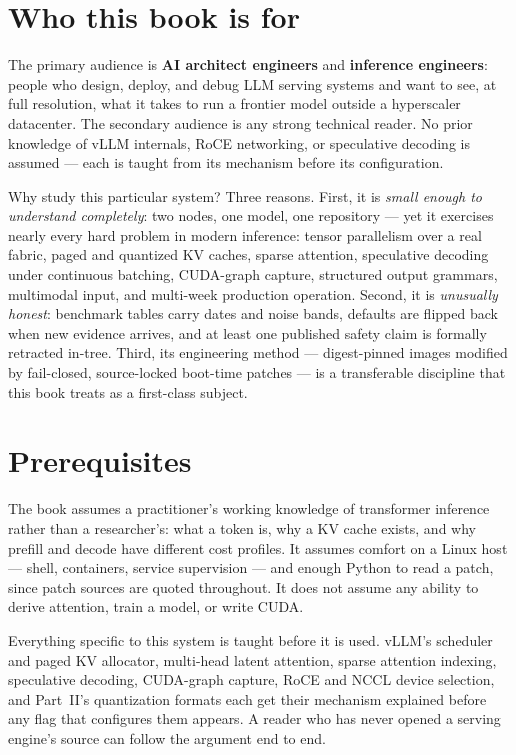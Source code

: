\section*{Who this book is for}

The primary audience is \textbf{AI architect engineers} and \textbf{inference
engineers}: people who design, deploy, and debug LLM serving systems and want
to see, at full resolution, what it takes to run a frontier model outside a
hyperscaler datacenter. The secondary audience is any strong technical reader.
No prior knowledge of vLLM internals, RoCE networking, or speculative decoding
is assumed --- each is taught from its mechanism before its configuration.

Why study this particular system? Three reasons. First, it is
\emph{small enough to understand completely}: two nodes, one model, one
repository --- yet it exercises nearly every hard problem in modern inference:
tensor parallelism over a real fabric, paged and quantized KV caches, sparse
attention, speculative decoding under continuous batching, CUDA-graph capture,
structured output grammars, multimodal input, and multi-week production
operation. Second, it is \emph{unusually honest}: benchmark tables carry
dates and noise bands, defaults are flipped back when new evidence arrives,
and at least one published safety claim is formally retracted in-tree. Third,
its engineering method --- digest-pinned images modified by fail-closed,
source-locked boot-time patches --- is a transferable discipline that this
book treats as a first-class subject.

\section*{Prerequisites}

The book assumes a practitioner's working knowledge of transformer inference
rather than a researcher's: what a token is, why a KV cache exists, and why
prefill and decode have different cost profiles. It assumes comfort on a
Linux host --- shell, containers, service supervision --- and enough Python
to read a patch, since patch sources are quoted throughout. It does not
assume any ability to derive attention, train a model, or write CUDA.

Everything specific to this system is taught before it is used. vLLM's
scheduler and paged KV allocator, multi-head latent attention, sparse
attention indexing, speculative decoding, CUDA-graph capture, RoCE and NCCL
device selection, and Part~II's quantization formats each get their mechanism
explained before any flag that configures them appears. A reader who has
never opened a serving engine's source can follow the argument end to end.

